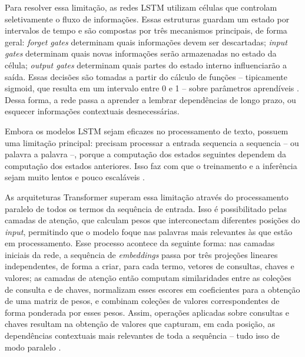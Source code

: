 Para resolver essa limitação, as redes LSTM utilizam células que controlam seletivamente o fluxo de informações. Essas estruturas guardam um estado por intervalos de tempo e são compostas por três mecanismos principais, de forma geral: \textit{forget gates} determinam quais informações devem ser descartadas; \textit{input gates} determinam quais novas informações serão armazenadas no estado da célula; \textit{output gates} determinam quais partes do estado interno influenciarão a saída. Essas decisões são tomadas a partir do cálculo de funções -- tipicamente sigmoid, que resulta em um intervalo entre 0 e 1 -- sobre parâmetros aprendíveis \cite{lstm}. Dessa forma, a rede passa a aprender a lembrar dependências de longo prazo, ou esquecer informações contextuais desnecessárias.

Embora os modelos LSTM sejam eficazes no processamento de texto, possuem uma limitação principal: precisam processar a entrada sequencia a sequencia -- ou palavra a palavra --, porque a computação dos estados seguintes dependem da computação dos estados anteriores. Isso faz com que o treinamento e a inferência sejam muito lentos e pouco escaláveis \cite{nlp2}.

As arquiteturas Transformer superam essa limitação através do processamento paralelo de todos os termos da sequência de entrada. Isso é possibilitado pelas camadas de atenção, que calculam pesos que interconectam diferentes posições do \textit{input}, permitindo que o modelo foque nas palavras mais relevantes às que estão em processamento. Esse processo acontece da seguinte forma: nas camadas iniciais da rede, a sequência de \textit{embeddings} passa por três projeções lineares independentes, de forma a criar, para cada termo, vetores de consultas, chaves e valores; as camadas de atenção então computam similaridades entre as coleções de consulta e de chaves, normalizam esses escores em coeficientes para a obtenção de uma matriz de pesos, e combinam coleções de valores correspondentes de forma ponderada por esses pesos. Assim, operações aplicadas sobre consultas e chaves resultam na obtenção de valores que capturam, em cada posição, as dependências contextuais mais relevantes de toda a sequência -- tudo isso de modo paralelo \cite{transformer}.

